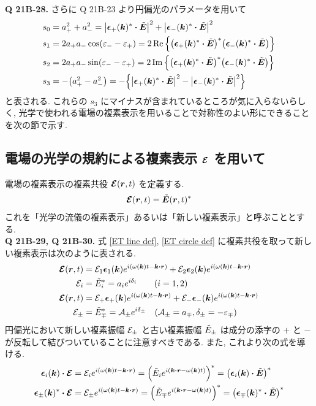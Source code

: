 \documentclass[uplatex,dvipdfmx,a4paper,11pt]{jlreq}
\newcommand{\rr}{\bm{r}}
\newcommand{\kk}{\bm{k}}
\theoremstyle{definition}
\begin{document}
\textbf{Q 21B-28.}
さらに Q 21B-23 より円偏光のパラメータを用いて
\begin{align}
  s_0 & = a_+^2 + a_-^2 = \qty|\ee_+(\kk)^*\vdot\ET|^2 + \qty|\ee_-(\kk)^*\vdot\ET|^2                                   \\
  s_1 & = 2a_+a_-\cos(\varepsilon_- - \varepsilon_+) = 2\Re\qty{\qty(\ee_+(\kk)^*\vdot\ET)^*\qty(\ee_-(\kk)^*\vdot\ET)} \\
  s_2 & = 2a_+a_-\sin(\varepsilon_- - \varepsilon_+) = 2\Im\qty{\qty(\ee_+(\kk)^*\vdot\ET)^*\qty(\ee_-(\kk)^*\vdot\ET)} \\
  s_3 & = -\qty(a_+^2 - a_-^2) = -\qty{\qty|\ee_+(\kk)^*\vdot\ET|^2 - \qty|\ee_-(\kk)^*\vdot\ET|^2}
\end{align}
と表される. これらの $s_3$ にマイナスが含まれているところが気に入らないらしく, 光学で使われる電場の複素表示を用いることで対称性のよい形にできることを次の節で示す.

\subsection{電場の光学の規約による複素表示 $\vb*{\mathcal{E}}$ を用いて}
電場の複素表示の複素共役 $\EC(\rr, t)$ を定義する.
\begin{align}
  \EC(\rr, t) = \ET(\rr, t)^*
\end{align}
これを「光学の流儀の複素表示」あるいは「新しい複素表示」と呼ぶこととする. \\

\textbf{Q 21B-29, Q 21B-30.}
式 \eqref{ET line def}, \eqref{ET circle def} に複素共役を取って新しい複素表示は次のように表される.
\begin{align}
  \EC(\rr, t) & = \Ec_1\ee_1(\kk)e^{\ii(\omega(\kk)t - \kk\vdot\rr)} + \Ec_2\ee_2(\kk)e^{\ii(\omega(\kk)t - \kk\vdot\rr)}      \\
  \Ec_i       & = \Et_i^* = a_ie^{\ii\delta_i} \qquad (i = 1, 2)                                                               \\
  \EC(\rr, t) & = \Ec_+\ee_+(\kk)e^{\ii(\omega(\kk)t - \kk\vdot\rr)} + \Ec_-\ee_-(\kk)e^{\ii(\omega(\kk)t - \kk\vdot\rr)}      \\
  \Ec_\pm     & = \Et_\mp^* = \mathcal{A}_\pm e^{\ii\delta_\pm} \quad (\mathcal{A}_\pm = a_\mp, \delta_\pm = -\varepsilon_\mp)
\end{align}
円偏光において新しい複素振幅 $\mathcal{E}_\pm$ と古い複素振幅 $\tilde{E}_\pm$ は成分の添字の $+$ と $-$ が反転して結びついていることに注意すべきである. また, これより次の式を導ける.
\begin{align}
  \ee_i(\kk)\vdot\EC
   & = \Ec_ie^{\ii(\omega(\kk)t - \kk\vdot\rr)} = \qty(\Et_i e^{\ii(\kk\vdot\rr - \omega(\kk)t)})^* = \qty(\ee_i(\kk)\vdot\ET)^* \label{EC ET converter 12}          \\
  \ee_\pm(\kk)^*\vdot\EC
   & = \Ec_\pm e^{\ii(\omega(\kk)t - \kk\vdot\rr)} = \qty(\Et_\mp e^{\ii(\kk\vdot\rr - \omega(\kk)t)})^* = \qty(\ee_\mp(\kk)^*\vdot\ET)^* \label{EC ET converter +-}
\end{align}
\\
\end{document}
